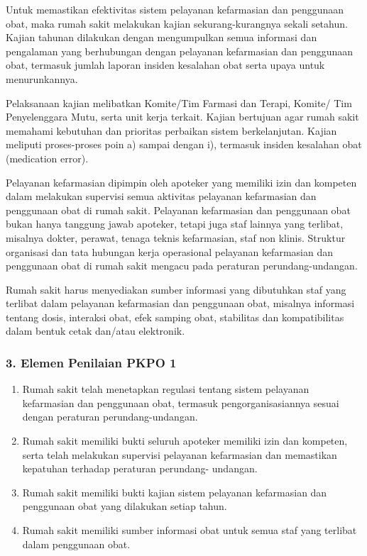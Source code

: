 \documentclass[
]{book}
\providecommand{\tightlist}{%
  \setlength{\itemsep}{0pt}\setlength{\parskip}{0pt}}
\begin{document}
Untuk memastikan efektivitas sistem pelayanan kefarmasian dan penggunaan obat, maka rumah sakit melakukan kajian sekurang-kurangnya sekali setahun. Kajian tahunan dilakukan dengan mengumpulkan semua informasi dan pengalaman yang berhubungan dengan pelayanan kefarmasian dan penggunaan obat, termasuk jumlah laporan insiden kesalahan obat serta upaya untuk menurunkannya.

Pelaksanaan kajian melibatkan Komite/Tim Farmasi dan Terapi, Komite/ Tim Penyelenggara Mutu, serta unit kerja terkait. Kajian bertujuan agar rumah sakit memahami kebutuhan dan prioritas perbaikan sistem berkelanjutan. Kajian meliputi proses-proses poin a) sampai dengan i), termasuk insiden kesalahan obat (medication error).

Pelayanan kefarmasian dipimpin oleh apoteker yang memiliki izin dan kompeten dalam melakukan supervisi semua aktivitas pelayanan kefarmasian dan penggunaan obat di rumah sakit. Pelayanan kefarmasian dan penggunaan obat bukan hanya tanggung jawab apoteker, tetapi juga staf lainnya yang terlibat, misalnya dokter, perawat, tenaga teknis kefarmasian, staf non klinis. Struktur organisasi dan tata hubungan kerja operasional pelayanan kefarmasian dan penggunaan obat di rumah sakit mengacu pada peraturan perundang-undangan.

Rumah sakit harus menyediakan sumber informasi yang dibutuhkan staf yang terlibat dalam pelayanan kefarmasian dan penggunaan obat, misalnya informasi tentang dosis, interaksi obat, efek samping obat, stabilitas dan kompatibilitas dalam bentuk cetak dan/atau elektronik.

\hypertarget{elemen-penilaian-pkpo-1}{%
\subsubsection*{3. Elemen Penilaian PKPO 1}\label{elemen-penilaian-pkpo-1}}

\begin{enumerate}
\def\labelenumi{\alph{enumi}.}
\tightlist
\item
  Rumah sakit telah menetapkan regulasi tentang sistem pelayanan kefarmasian dan penggunaan obat, termasuk pengorganisasiannya sesuai dengan peraturan perundang-undangan.
\item
  Rumah sakit memiliki bukti seluruh apoteker memiliki izin dan kompeten, serta telah melakukan supervisi pelayanan kefarmasian dan memastikan kepatuhan terhadap peraturan perundang- undangan.
\item
  Rumah sakit memiliki bukti kajian sistem pelayanan kefarmasian dan penggunaan obat yang dilakukan setiap tahun.
\item
  Rumah sakit memiliki sumber informasi obat untuk semua staf yang terlibat dalam penggunaan obat.
\end{enumerate}
\end{document}
